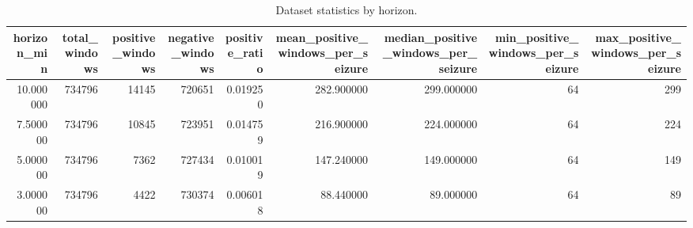 \begin{table}
\caption{Dataset statistics by horizon.}
\label{tab:preictal_horizon_dataset_statistics}
\begin{tabular}{rrrrrrrrr}
\toprule
horizon\_min & total\_windows & positive\_windows & negative\_windows & positive\_ratio & mean\_positive\_windows\_per\_seizure & median\_positive\_windows\_per\_seizure & min\_positive\_windows\_per\_seizure & max\_positive\_windows\_per\_seizure \\
\midrule
10.000000 & 734796 & 14145 & 720651 & 0.019250 & 282.900000 & 299.000000 & 64 & 299 \\
7.500000 & 734796 & 10845 & 723951 & 0.014759 & 216.900000 & 224.000000 & 64 & 224 \\
5.000000 & 734796 & 7362 & 727434 & 0.010019 & 147.240000 & 149.000000 & 64 & 149 \\
3.000000 & 734796 & 4422 & 730374 & 0.006018 & 88.440000 & 89.000000 & 64 & 89 \\
\bottomrule
\end{tabular}
\end{table}

